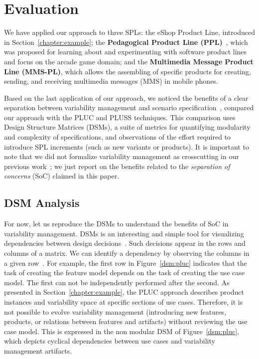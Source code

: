 \documentclass[11pt]{report}
\begin{document}
\chapter{Evaluation}
\label{sec:evaluation}

We have applied our approach to three SPLs: the eShop Product Line, introduced in Section~\ref{chapter:example}; the  
{\bf Pedagogical Product Line (PPL)}~\cite{ppl-url}, which was proposed for learning about and experimenting with software product lines and focus on the arcade game domain; and the 
{\bf Multimedia Message Product Line (MMS-PL)}, which allows the assembling of specific products for creating, sending, and receiving multimedia messages (MMS) in mobile phones.

Based on the last application of our approach, we noticed the benefits of a clear
separation between variability management and scenario
specification~\cite{rbonifacio-ea-2008}, compared our approach with the PLUC and
PLUSS techniques. This comparison uses Design Structure Matrices (DSMs), a suite
of metrics for quantifying modularity and complexity of specifications, and
observations of the effort required to introduce SPL increments (such as new
variants or products). It is important to note that we did not formalize
variability management as crosscutting in our previous
work~\cite{rbonifacio-ea-2008}; we just report on the benefits related to the
\emph{separation of concerns} (SoC) claimed in this paper.

\section{DSM Analysis}
For now, let us reproduce the DSMs to understand the benefits of SoC in
variability management. DSMs is an interesting and simple tool for visualizing
dependencies between design decisions~\cite{clark-design-rules-book}. Such
decisions appear in the rows and columns of a matrix. We can identify a
dependency by observing the columns in a given
row~\cite{clark-design-rules-book}. For example, the first row in
Figure~\ref{dsm:pluc} indicates that the task of creating the feature model
depends on the task of creating the use case model. The first can not be
independently performed after the second. As presented in
Section~\ref{chapter:example}, the PLUC approach describes product instances and
variability space at specific sections of use cases. Therefore, it is not
possible to evolve variability management (introducing new features, products, or
relations between features and artifacts) without reviewing the use case model. 
This is expressed in the non modular DSM of Figure~\ref{dsm:pluc}, which depicts
cyclical dependencies between use cases and variability management artifacts.
\end{document}
